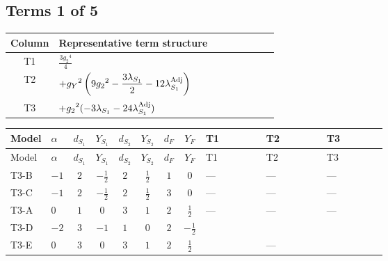 \documentclass[8pt]{article}
\begin{document}
\begin{landscape}
\subsection*{Terms 1 of 5}
\begin{center}
\begin{tabular}{@{}c >{\raggedright\arraybackslash}p{0.82\linewidth}@{}}
\toprule
Column & Representative term structure \\
\midrule
T1 & \(\displaystyle \frac{3 {g_2}^4}{4}\) \\
\midrule
T2 & \(\displaystyle +{g_Y}^2 \left(9 {g_2}^2-\frac{3 {\lambda_{S_1}}}{2}-12 {\lambda_{S_1}^{\rm Adj}}\right)\) \\
\midrule
T3 & \(\displaystyle +{g_2}^2 (-3 {\lambda_{S_1}}-24 {\lambda_{S_1}^{\rm Adj}})\) \\
\midrule
\bottomrule
\end{tabular}
\end{center}
\smallskip
\tiny
\begin{longtable}{@{}llcccccc >{\raggedright\arraybackslash}p{0.21\linewidth} >{\raggedright\arraybackslash}p{0.21\linewidth} >{\raggedright\arraybackslash}p{0.21\linewidth}@{}}
\toprule
Model & $\alpha$ & $d_{S_1}$ & $Y_{S_1}$ & $d_{S_2}$ & $Y_{S_2}$ & $d_F$ & $Y_F$ & T1 & T2 & T3 \\
\midrule
\endfirsthead
\toprule
Model & $\alpha$ & $d_{S_1}$ & $Y_{S_1}$ & $d_{S_2}$ & $Y_{S_2}$ & $d_F$ & $Y_F$ & T1 & T2 & T3 \\
\midrule
\endhead
T3-B & $-1$ & $2$ & $-\frac{1}{2}$ & $2$ & $\frac{1}{2}$ & $1$ & $0$ & --- & --- & --- \\
\midrule
T3-C & $-1$ & $2$ & $-\frac{1}{2}$ & $2$ & $\frac{1}{2}$ & $3$ & $0$ & --- & --- & --- \\
\midrule
T3-A & $0$ & $1$ & $0$ & $3$ & $1$ & $2$ & $\frac{1}{2}$ & --- & --- & --- \\
\midrule
T3-D & $-2$ & $3$ & $-1$ & $1$ & $0$ & $2$ & $-\frac{1}{2}$ & \scriptsize\adjustbox{max width=\linewidth}{$\begin{gathered} \frac{3 {g_2}^4}{4}\end{gathered}$} & \scriptsize\adjustbox{max width=\linewidth}{$\begin{gathered} +{g_Y}^2 \left(9 {g_2}^2-\frac{3 {\lambda_{S_1}}}{2}-12 {\lambda_{S_1}^{\rm Adj}}\right)\end{gathered}$} & \scriptsize\adjustbox{max width=\linewidth}{$\begin{gathered} +{g_2}^2 (-3 {\lambda_{S_1}}-24 {\lambda_{S_1}^{\rm Adj}})\end{gathered}$} \\
\midrule
T3-E & $0$ & $3$ & $0$ & $3$ & $1$ & $2$ & $\frac{1}{2}$ & \scriptsize\adjustbox{max width=\linewidth}{$\begin{gathered} \frac{3 {g_2}^4}{4}\end{gathered}$} & --- & \scriptsize\adjustbox{max width=\linewidth}{$\begin{gathered} +{g_2}^2 (-3 {\lambda_{S_1}}-24 {\lambda_{S_1}^{\rm Adj}})\end{gathered}$} \\
\midrule
\bottomrule
\end{longtable}
\clearpage

\end{landscape}
\end{document}
